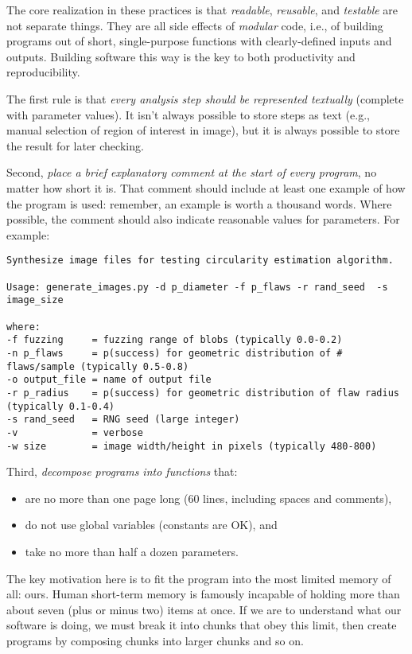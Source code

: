 \documentclass[10pt]{article}
\begin{document}
The core realization in these practices is that \emph{readable},
\emph{reusable}, and \emph{testable} are not separate things. They are
all side effects of \emph{modular} code, i.e., of building programs out
of short, single-purpose functions with clearly-defined inputs and
outputs. Building software this way is the key to both productivity and
reproducibility.

The first rule is that \emph{every analysis step should be represented
textually} (complete with parameter values). It isn't always possible to
store steps as text (e.g., manual selection of region of interest in
image), but it is always possible to store the result for later
checking.

Second, \emph{place a brief explanatory comment at the start of every
program}, no matter how short it is. That comment should include at
least one example of how the program is used: remember, an example is
worth a thousand words. Where possible, the comment should also indicate
reasonable values for parameters. For example:

\begin{verbatim}
Synthesize image files for testing circularity estimation algorithm.

Usage: generate_images.py -d p_diameter -f p_flaws -r rand_seed  -s image_size

where:
-f fuzzing     = fuzzing range of blobs (typically 0.0-0.2)
-n p_flaws     = p(success) for geometric distribution of # flaws/sample (typically 0.5-0.8)
-o output_file = name of output file
-r p_radius    = p(success) for geometric distribution of flaw radius (typically 0.1-0.4)
-s rand_seed   = RNG seed (large integer)
-v             = verbose
-w size        = image width/height in pixels (typically 480-800)
\end{verbatim}

Third, \emph{decompose programs into functions} that:

\begin{itemize}
\item
  are no more than one page long (60 lines, including spaces and
  comments),
\item
  do not use global variables (constants are OK), and
\item
  take no more than half a dozen parameters.
\end{itemize}

The key motivation here is to fit the program into the most limited
memory of all: ours. Human short-term memory is famously incapable of
holding more than about seven (plus or minus two) items at once. If we
are to understand what our software is doing, we must break it into
chunks that obey this limit, then create programs by composing chunks
into larger chunks and so on.
\end{document}
